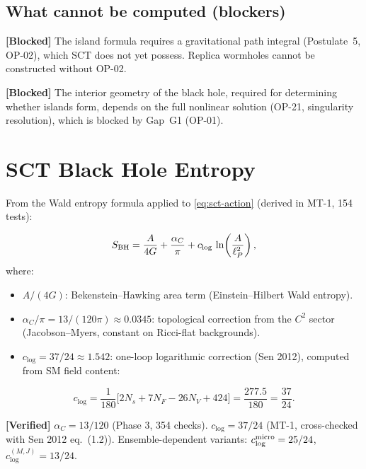 \documentclass[11pt,a4paper]{article}
\theoremstyle{plain}
\theoremstyle{definition}
\newcommand{\verified}[1]{%
  \par\smallskip\noindent
  \colorbox{green!10}{\parbox{\dimexpr\linewidth-2\fboxsep}{%
    \textcolor{green!50!black}{\textbf{[Verified]}} #1}}%
  \par\smallskip}
\newcommand{\blocked}[1]{%
  \par\smallskip\noindent
  \colorbox{red!10}{\parbox{\dimexpr\linewidth-2\fboxsep}{%
    \textcolor{red!60!black}{\textbf{[Blocked]}} #1}}%
  \par\smallskip}
\begin{document}
\subsection{What cannot be computed (blockers)}

\blocked{The island formula requires a gravitational path integral
  (Postulate~5, OP-02), which SCT does not yet possess.  Replica
  wormholes cannot be constructed without OP-02.}

\blocked{The interior geometry of the black hole, required for
  determining whether islands form, depends on the full nonlinear
  solution (OP-21, singularity resolution), which is blocked by
  Gap~G1 (OP-01).}


\section{SCT Black Hole Entropy}
\label{sec:entropy}

From the Wald entropy formula applied to \cref{eq:sct-action}
(derived in MT-1, 154 tests):

\begin{equation}
\label{eq:sct-entropy}
S_{\rm BH} = \frac{A}{4G}
  + \frac{\alpha_C}{\pi}
  + c_{\log}\,\ln\!\left(\frac{A}{\ell_P^2}\right),
\end{equation}
where:
\begin{itemize}
\item $A/(4G)$: Bekenstein--Hawking area term (Einstein--Hilbert Wald entropy).
\item $\alpha_C/\pi = 13/(120\pi) \approx 0.0345$: topological correction
      from the $C^2$ sector (Jacobson--Myers, constant on Ricci-flat backgrounds).
\item $c_{\log} = 37/24 \approx 1.542$: one-loop logarithmic correction
      (Sen 2012), computed from SM field content:
\end{itemize}
\begin{equation}
c_{\log} = \frac{1}{180}\bigl[2N_s + 7N_F - 26N_V + 424\bigr]
         = \frac{277.5}{180} = \frac{37}{24}.
\end{equation}

\verified{$\alpha_C = 13/120$ (Phase 3, 354 checks).
  $c_{\log} = 37/24$ (MT-1, cross-checked with Sen 2012 eq.~(1.2)).
  Ensemble-dependent variants: $c_{\log}^{\rm micro} = 25/24$,
  $c_{\log}^{(M,J)} = 13/24$.}


\end{document}
